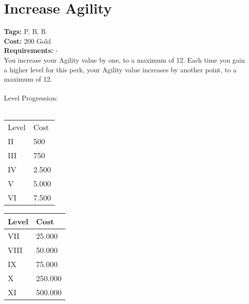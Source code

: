 \section{Increase Agility}\label{sec:increaseagility}
\textbf{Tags:} P, B, R\\
\textbf{Cost:} 200 Gold\\
\textbf{Requirements:} -\\
You increase your Agility value by one, to a maximum of 12.
Each time you gain a higher level for this perk, your Agility value increases by another point, to a maximum of 12.\\
\\
Level Progression:\\
\\
\begin{minipage}{0.5\textwidth}
    \begin{tabular}{l | l}
        Level & Cost\\
        II & 500\\
        III & 750\\
        IV & 2.500\\
        V & 5.000\\
        VI & 7.500\\
    \end{tabular}
\end{minipage}
\begin{minipage}{0.5\textwidth}
    \begin{tabular}{l | l}
        Level & Cost\\ \hline
        VII & 25.000\\
        VIII & 50.000\\
        IX & 75.000\\
        X & 250.000\\
        XI & 500.000\\
    \end{tabular}
\end{minipage}
